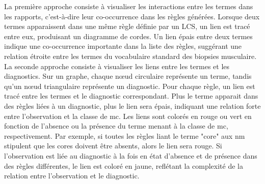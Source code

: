La première approche consiste à visualiser les interactions entre les termes dans les rapports, c'est-à-dire leur co-occurrence dans les règles générées. Lorsque deux termes apparaissent dans une même règle définie par un LCS, un lien est tracé entre eux, produisant un diagramme de cordes. Un lien épais entre deux termes indique une co-occurrence importante dans la liste des règles, suggérant une relation étroite entre les termes du vocabulaire standard des biopsies musculaire.
La seconde approche consiste à visualiser les liens entre les termes et les diagnostics. Sur un graphe, chaque nœud circulaire représente un terme, tandis qu'un nœud triangulaire représente un diagnostic. Pour chaque règle, un lien est tracé entre les termes et le diagnostic correspondant. Plus le terme apparait dans des règles liées à un diagnostic, plus le lien sera épais, indiquant une relation forte entre l'observation et la classe de \gls{mc}. Les liens sont colorés en rouge ou vert en fonction de l'absence ou la présence du terme menant à la classe de \gls{mc}, respectivement. Par exemple, si toutes les règles liant le terme "core" aux \gls{nm} stipulent que les cores doivent être absents, alors le lien sera rouge. Si l'observation est liée au diagnostic à la fois en état d'absence et de présence dans des règles différentes, le lien est coloré en jaune, reflétant la complexité de la relation entre l'observation et le diagnostic.

